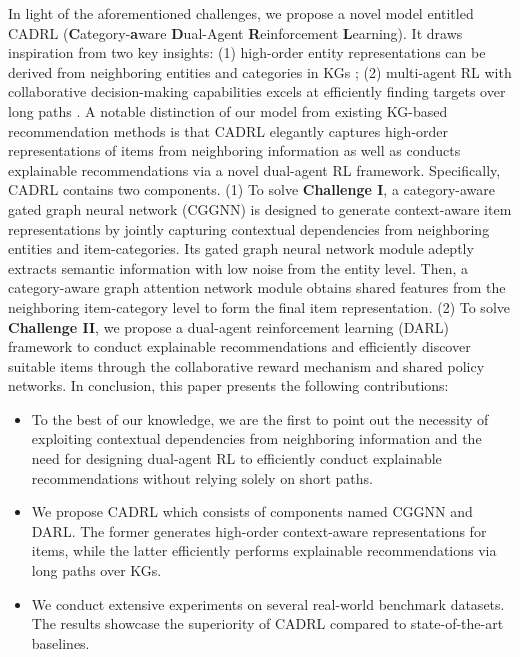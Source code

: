 \documentclass[conference]{IEEEtran}
\begin{document}
In light of the aforementioned challenges, we propose a novel model entitled CADRL  (\textbf{C}ategory-\textbf{a}ware \textbf{D}ual-Agent
\textbf{R}einforcement \textbf{L}earning). It draws inspiration from two key insights: (1) high-order entity representations can be derived from neighboring entities and categories in KGs \cite{KGsurvey}; (2) multi-agent RL with collaborative decision-making capabilities excels at efficiently finding targets over long paths \cite{MARLsurvey} \cite{EX7}. A notable distinction of our model from existing KG-based recommendation methods is that CADRL elegantly captures high-order representations of items from neighboring information as well as conducts explainable recommendations via a novel dual-agent RL framework. Specifically, CADRL contains two components. (1) To solve \textbf{Challenge I}, a category-aware gated graph neural network (CGGNN) is designed to generate context-aware  item representations by jointly capturing contextual dependencies from neighboring entities and item-categories. Its gated graph neural network module adeptly extracts semantic information with low noise from the entity level. Then, a category-aware graph attention network module obtains shared features from the neighboring item-category level to form the final item representation. (2) To solve \textbf{Challenge II}, we propose a dual-agent reinforcement learning (DARL) framework to conduct explainable recommendations and efficiently discover suitable items through the collaborative reward mechanism and shared policy networks. In conclusion, this paper presents the following contributions:

\begin{itemize}
\item To the best of our knowledge, we are the first to point out the necessity of  exploiting contextual dependencies from neighboring information and the need for designing dual-agent RL to efficiently conduct explainable recommendations without relying solely on short paths.
\item  We propose CADRL which consists of components named CGGNN and DARL. The former generates high-order context-aware representations for items, while the latter efficiently performs explainable recommendations via long paths over KGs.
\item We conduct extensive experiments on several real-world benchmark datasets. The results showcase the superiority of CADRL compared to state-of-the-art baselines.
\end{itemize}
\end{document}
